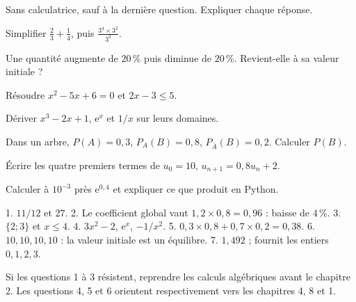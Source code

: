 Sans calculatrice, sauf à la dernière question. Expliquer chaque réponse.
\begin{questions}
\item Simplifier $\frac23+\frac14$, puis $\frac{3^4\times3^2}{3^3}$.
\item Une quantité augmente de $20\,\%$ puis diminue de $20\,\%$. Revient-elle à sa valeur initiale ?
\item Résoudre $x^2-5x+6=0$ et $2x-3\leq5$.
\item Dériver $x^3-2x+1$, $\mathrm e^x$ et $1/x$ sur leurs domaines.
\item Dans un arbre, $P(A)=0{,}3$, $P_A(B)=0{,}8$, $P_{\bar A}(B)=0{,}2$. Calculer $P(B)$.
\item Écrire les quatre premiers termes de $u_0=10$, $u_{n+1}=0{,}8u_n+2$.
\item Calculer à $10^{-3}$ près $\mathrm e^{0{,}4}$ et expliquer ce que produit  en Python.
\end{questions}
\begin{savoirfaire}
1. $11/12$ et $27$. 2. Le coefficient global vaut $1{,}2\times0{,}8=0{,}96$ : baisse de $4\,\%$.
3. $\{2;3\}$ et $x\leq4$. 4. $3x^2-2$, $\mathrm e^x$, $-1/x^2$.
5. $0{,}3\times0{,}8+0{,}7\times0{,}2=0{,}38$.
6. $10,10,10,10$ : la valeur initiale est un équilibre.
7. $1{,}492$ ;  fournit les entiers $0,1,2,3$.
\end{savoirfaire}
Si les questions 1 à 3 résistent, reprendre les calculs algébriques avant le chapitre 2.
Les questions 4, 5 et 6 orientent respectivement vers les chapitres 4, 8 et 1.

